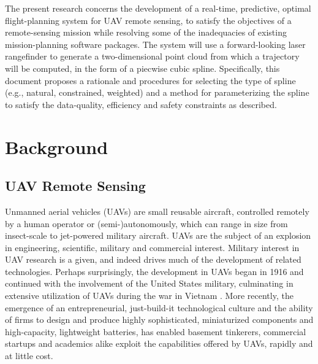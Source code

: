 \documentclass[doc]{apa6}
\begin{document}
The present research concerns the development of a real-time, predictive, optimal flight-planning system for UAV remote sensing, to satisfy the objectives of a remote-sensing mission while resolving some of the inadequacies of existing mission-planning software packages. The system will use a forward-looking laser rangefinder to generate a two-dimensional point cloud from which a trajectory will be computed, in the form of a piecwise cubic spline. Specifically, this document proposes a rationale and procedures for selecting the type of spline (e.g., natural, constrained, weighted) and a method for parameterizing the spline to satisfy the data-quality, efficiency and safety constraints as described. 

\section{Background}

\subsection{UAV Remote Sensing}

Unmanned aerial vehicles (UAVs) are small reusable aircraft, controlled remotely by a human operator or (semi-)autonomously, which can range in size from insect-scale \parencite{Avadhanula2002,Deng2003} to jet-powered military aircraft. UAVs are the subject of an explosion in engineering, scientific, military and commercial interest. Military interest in UAV research is a given, and indeed drives much of the development of related technologies. Perhaps surprisingly, the development in UAVs began in 1916 and continued with the involvement of the United States military, culminating in extensive utilization of UAVs during the war in Vietnam \parencite{Valavanis2007,Cook2007}. More recently, the emergence of an entrepreneurial, just-build-it technological culture and the ability of firms to design and produce highly sophisticated, miniaturized components and high-capacity, lightweight batteries, has enabled basement tinkerers, commercial startups and academics alike exploit the capabilities offered by UAVs, rapidly and at little cost.
\end{document}
